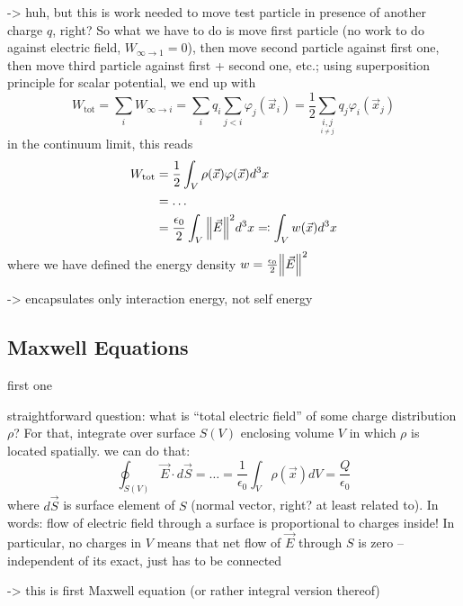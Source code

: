 \documentclass[../class_mech_main.tex]{subfiles}
\begin{document}
-> huh, but this is work needed to move test particle in presence of another charge $q$, right? So what we have to do is move first particle (no work to do against electric field, $W_{\infty \rightarrow 1} = 0$), then move second particle against first one, then move third particle against first + second one, etc.; using superposition principle for scalar potential, we end up with
\begin{equation}
    W_\mathrm{tot} = \sum_i W_{\infty \rightarrow i}
    = \sum_i q_i \sum_{j < i} \varphi_j(\vec{x}_i)
    = \frac{1}{2} \sum_{\underset{i \neq j}{i, j}} q_j \varphi_i(\vec{x}_j)
\end{equation}
in the continuum limit, this reads
\begin{align}
    W_\mathrm{tot} &= \frac{1}{2} \int_V \rho(\vec{x}) \varphi(\vec{x}) d^3x
    \\
    &= \ldots
    \notag\\
    &= \frac{\epsilon_0}{2} \int_V \norm{\vec{E}}^2 d^3x \eqqcolon \int_V w(\vec{x}) d^3x
\end{align}
where we have defined the energy density $w = \frac{\epsilon_0}{2} \norm{\vec{E}}^2$

-> encapsulates only interaction energy, not self energy 



        \subsection{Maxwell Equations}

first one


straightforward question: what is \enquote{total electric field} of some charge distribution $\rho$? For that, integrate over surface $S(V)$ enclosing volume $V$ in which $\rho$ is located spatially. we can do that:
\begin{equation}
    \oint_{S(V)} \vec{E} \cdot d\vec{S} = \ldots = \frac{1}{\epsilon_0} \int_V \rho(\vec{x}) dV = \frac{Q}{\epsilon_0}
\end{equation}
where $d\vec{S}$ is surface element of $S$ (normal vector, right? at least related to). In words: flow of electric field through a surface is proportional to charges inside! In particular, no charges in $V$ means that net flow of $\vec{E}$ through $S$ is zero -- independent of its exact, just has to be connected

-> this is first Maxwell equation (or rather integral version thereof)
\end{document}

